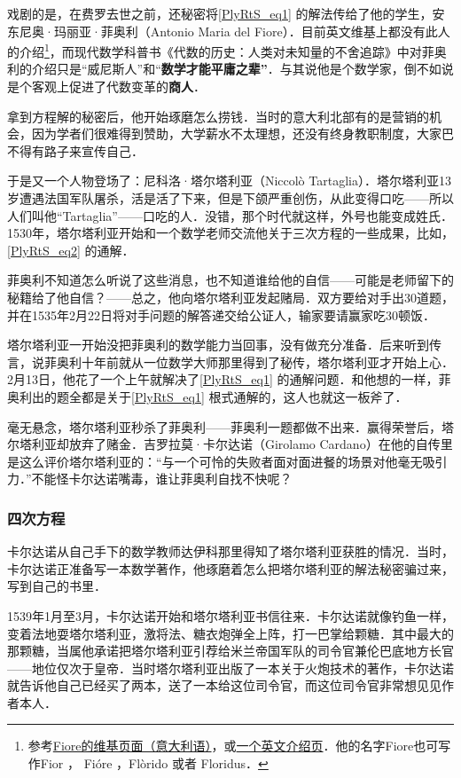 戏剧的是，在费罗去世之前，还秘密将\autoref{PlyRtS_eq1} 的解法传给了他的学生，安东尼奥·玛丽亚·菲奥利（Antonio Maria del Fiore）．目前英文维基上都没有此人的介绍\footnote{参考\href{https://es.wikipedia.org/wiki/Antonio_Maria_del_Fiore}{Fiore的维基页面（意大利语）}，或\href{https://second.wiki/wiki/antonio_maria_del_fiore}{一个英文介绍页}．他的名字Fiore也可写作Fior ， Fióre ，Flòrido 或者 Floridus．}，而现代数学科普书《代数的历史：人类对未知量的不舍追踪》中对菲奥利的介绍只是“威尼斯人”和“\textbf{数学才能平庸之辈”}．与其说他是个数学家，倒不如说是个客观上促进了代数变革的\textbf{商人}．

拿到方程解的秘密后，他开始琢磨怎么捞钱．当时的意大利北部有的是营销的机会，因为学者们很难得到赞助，大学薪水不太理想，还没有终身教职制度，大家巴不得有路子来宣传自己．

于是又一个人物登场了：尼科洛·塔尔塔利亚（Niccolò Tartaglia）．塔尔塔利亚13岁遭遇法国军队屠杀，活是活了下来，但是下颌严重创伤，从此变得口吃——所以人们叫他“Tartaglia”——口吃的人．没错，那个时代就这样，外号也能变成姓氏．1530年，塔尔塔利亚开始和一个数学老师交流他关于三次方程的一些成果，比如，\autoref{PlyRtS_eq2} 的通解．

菲奥利不知道怎么听说了这些消息，也不知道谁给他的自信——可能是老师留下的秘籍给了他自信？——总之，他向塔尔塔利亚发起赌局．双方要给对手出30道题，并在1535年2月22日将对手问题的解答递交给公证人，输家要请赢家吃30顿饭．

塔尔塔利亚一开始没把菲奥利的数学能力当回事，没有做充分准备．后来听到传言，说菲奥利十年前就从一位数学大师那里得到了秘传，塔尔塔利亚才开始上心．2月13日，他花了一个上午就解决了\autoref{PlyRtS_eq1} 的通解问题．和他想的一样，菲奥利出的题全都是关于\autoref{PlyRtS_eq1} 根式通解的，这人也就这一板斧了．

毫无悬念，塔尔塔利亚秒杀了菲奥利——菲奥利一题都做不出来．赢得荣誉后，塔尔塔利亚却放弃了赌金．吉罗拉莫·卡尔达诺（Girolamo Cardano）在他的自传里是这么评价塔尔塔利亚的：“与一个可怜的失败者面对面进餐的场景对他毫无吸引力．”不能怪卡尔达诺嘴毒，谁让菲奥利自找不快呢？

\subsubsection{四次方程}

卡尔达诺从自己手下的数学教师达伊科那里得知了塔尔塔利亚获胜的情况．当时，卡尔达诺正准备写一本数学著作，他琢磨着怎么把塔尔塔利亚的解法秘密骗过来，写到自己的书里．

1539年1月至3月，卡尔达诺开始和塔尔塔利亚书信往来．卡尔达诺就像钓鱼一样，变着法地耍塔尔塔利亚，激将法、糖衣炮弹全上阵，打一巴掌给颗糖．其中最大的那颗糖，当属他承诺把塔尔塔利亚引荐给米兰帝国军队的司令官兼伦巴底地方长官——地位仅次于皇帝．当时塔尔塔利亚出版了一本关于火炮技术的著作，卡尔达诺就告诉他自己已经买了两本，送了一本给这位司令官，而这位司令官非常想见见作者本人．

